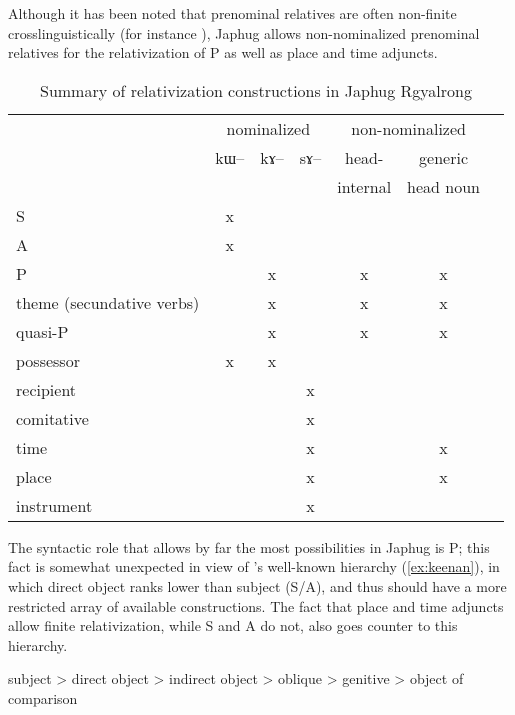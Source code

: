 \documentclass[oldfontcommands,oneside,a4paper,11pt]{article}
\newcommand{\ipa}[1]{{\phon #1}} %
\begin{document}
Although it has been noted that prenominal relatives are often non-finite crosslinguistically (for instance \citealt[596-8]{wu11prenominal}), Japhug allows non-nominalized prenominal relatives for the relativization of P as well as place and time adjuncts.

\begin{table}[h]
\caption{Summary of relativization constructions in Japhug Rgyalrong} \label{tab:summary}
\centering
\begin{tabular}{l|ccc|cc|l}
\toprule
   &  	\multicolumn{3}{c}{nominalized}     	   \vline &  	\multicolumn{2}{c}{non-nominalized}  	   \vline    	\\
   &  	\ipa{kɯ}--   &  	\ipa{kɤ}--   &  	\ipa{sɤ}--   &  	head-   &  	generic     	\\
&&&&internal   &head noun \\
   \midrule
S   &  	x   &  	   &  	   &  	   &  	   &  	\\
A   &  	x   &  	   &  	   &  	   &  	   &  	\\
P   &  	   &  	x   &  	   &  	x   &  	x   &  	\\
theme (secundative verbs)   &  	   &  	x   &  	   &  	x   &  	x   &  	\\
quasi-P   &  	   &  	x   &  	   &  	x    &  x	   &  	\\
possessor   &  	x   &  	x   &  	   &  	   &  	   &  	\\
recipient   &  	   &  	   &  	x   &  	   &  	   &  	\\
comitative   &  	   &  	   &  	x   &  	   &  	   &  	\\
time    &  	   &  	   &  	x   &  	   &  	x   &  	\\
place   &  	   &  	   &  	x   &  	   &  	x   &  	\\
instrument   &  	   &  	   &  	x   &  	   &  	   &  	\\
\bottomrule
\end{tabular}
\end{table}

The syntactic role that allows by far the most possibilities in Japhug is P; this fact is somewhat unexpected in view of   \citet{keenan77accessibility}'s well-known hierarchy (\ref{ex:keenan}), in which direct object ranks lower than subject (S/A), and thus should have a more restricted array of available constructions. The fact that place and time adjuncts allow finite relativization, while S and A do not, also goes counter to this hierarchy.
\begin{exe}
\ex \label{ex:keenan}
\glt  subject > direct object > indirect object > oblique > genitive > object of comparison
\end{exe}
\end{document}
